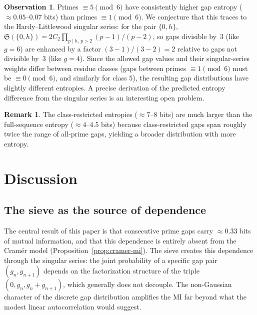 \documentclass[11pt, a4paper]{amsart}
\theoremstyle{plain}
\theoremstyle{definition}
\newtheorem{remark}[theorem]{Remark}
\newtheorem{observation}[theorem]{Observation}
\newcommand{\fS}{\mathfrak{S}}
\begin{document}
\begin{observation}
Primes $\equiv 5 \pmod{6}$ have consistently higher gap entropy ($\approx 0.05$--$0.07$ bits) than primes $\equiv 1 \pmod{6}$. We conjecture that this traces to the Hardy--Littlewood singular series: for the pair $\{0, h\}$, $\fS(\{0, h\}) = 2C_2 \prod_{p \mid h,\, p > 2} (p-1)/(p-2)$, so gaps divisible by~$3$ (like $g = 6$) are enhanced by a factor $(3-1)/(3-2) = 2$ relative to gaps not divisible by~$3$ (like $g = 4$).
Since the allowed gap values and their singular-series weights differ between residue classes (gaps between primes $\equiv 1 \pmod{6}$ must be $\equiv 0 \pmod{6}$, and similarly for class $5$), the resulting gap distributions have slightly different entropies. A precise derivation of the predicted entropy difference from the singular series is an interesting open problem.
\end{observation}

\begin{remark}
The class-restricted entropies ($\approx 7$--$8$ bits) are much larger than the full-sequence entropy ($\approx 4$--$4.5$ bits) because class-restricted gaps span roughly twice the range of all-prime gaps, yielding a broader distribution with more entropy.
\end{remark}


\section{Discussion}
\label{sec:discussion}

\subsection{The sieve as the source of dependence}

The central result of this paper is that consecutive prime gaps carry $\approx 0.33$ bits of mutual information, and that this dependence is entirely absent from the Cram\'er model (Proposition~\ref{prop:cramer-mi}).
The sieve creates this dependence through the singular series: the joint probability of a specific gap pair $(g_n, g_{n+1})$ depends on the factorization structure of the triple $(0, g_n, g_n + g_{n+1})$, which generally does not decouple.
The non-Gaussian character of the discrete gap distribution amplifies the MI far beyond what the modest linear autocorrelation would suggest.
\end{document}
